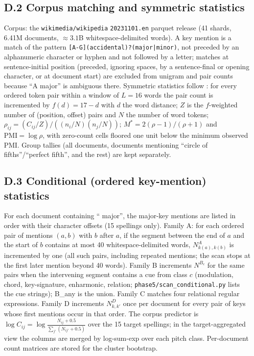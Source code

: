 \documentclass[11pt]{article}
\begin{document}
\subsection*{D.2 Corpus matching and symmetric statistics}
Corpus: the \texttt{wikimedia/wikipedia} \texttt{20231101.en} parquet release (41 shards, 6.41M documents, $\approx3.1$B whitespace-delimited words). A key mention is a match of the pattern \texttt{[A-G](accidental)?\textvisiblespace(major|minor)}, not preceded by an alphanumeric character or hyphen and not followed by a letter; matches at sentence-initial position (preceded, ignoring spaces, by a sentence-final or opening character, or at document start) are excluded from unigram and pair counts because ``A major'' is ambiguous there. Symmetric statistics follow \citet{karkada2026symmetry}: for every ordered token pair within a window of $L=16$ words the pair count is incremented by $f(d)=17-d$ with $d$ the word distance; $Z$ is the $f$-weighted number of (position, offset) pairs and $N$ the number of word tokens; $\rho_{ij}=(C_{ij}/Z)/((n_i/N)(n_j/N))$; $M^*=2(\rho-1)/(\rho+1)$ and $\mathrm{PMI}=\log\rho$, with zero-count cells floored one unit below the minimum observed PMI. Group tallies (all documents, documents mentioning ``circle of fifths''/``perfect fifth'', and the rest) are kept separately.

\subsection*{D.3 Conditional (ordered key-mention) statistics}
For each document containing `` major'', the major-key mentions are listed in order with their character offsets (15 spellings only). Family A: for each ordered pair of mentions $(a,b)$ with $b$ after $a$, if the segment between the end of $a$ and the start of $b$ contains at most 40 whitespace-delimited words, $N^{A}_{k(a),k(b)}$ is incremented by one (all such pairs, including repeated mentions; the scan stops at the first later mention beyond 40 words). Family B increments $N^{B_c}$ for the same pairs when the intervening segment contains a cue from class $c$ (modulation, chord, key-signature, enharmonic, relation; \texttt{phase5/scan\_conditional.py} lists the cue strings); B\_any is the union. Family C matches four relational regular expressions. Family D increments $N^{D}_{k,k'}$ once per document for every pair of keys whose first mentions occur in that order. The corpus predictor is $\log C_{ij}=\log\frac{N_{ij}+0.5}{\sum_{j'}(N_{ij'}+0.5)}$ over the 15 target spellings; in the target-aggregated view the columns are merged by log-sum-exp over each pitch class. Per-document count matrices are stored for the cluster bootstrap.
\end{document}
